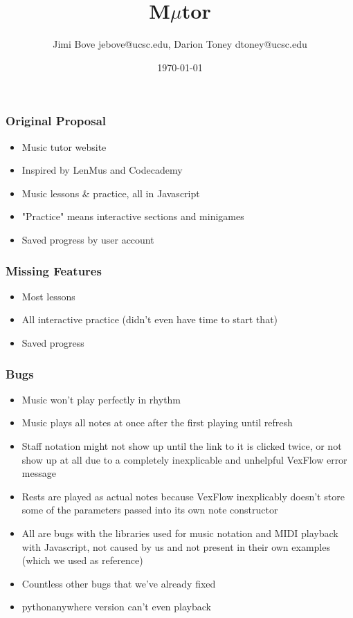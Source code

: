 \documentclass[24pt]{beamer}
\title{M$\mu$tor}
\author{Jimi Bove jebove@ucsc.edu, Darion Toney dtoney@ucsc.edu}
\date{\today}
\begin{document}
\maketitle

\begin{frame}
\frametitle{Original Proposal}
\begin{itemize}
  \item Music tutor website
  \item Inspired by LenMus and Codecademy
  \item Music lessons \& practice, all in Javascript
  \item "Practice" means interactive sections and minigames
  \item Saved progress by user account
\end{itemize}
\end{frame}

\begin{frame}
\frametitle{Missing Features}
\begin{itemize}
  \item Most lessons
  \item All interactive practice (didn't even have time to start that)
  \item Saved progress
\end{itemize}
\end{frame}

\begin{frame}
\frametitle{Bugs}
\begin{itemize}
  \item Music won't play perfectly in rhythm
  \item Music plays all notes at once after the first playing until refresh
  \item Staff notation might not show up until the link to it is clicked twice, or not show up at all due to a completely inexplicable and unhelpful VexFlow error message
  \item Rests are played as actual notes because VexFlow inexplicably doesn't store some of the parameters passed into its own note constructor
  \item All are bugs with the libraries used for music notation and MIDI playback with Javascript, not caused by us and not present in their own examples (which we used as reference)
  \item Countless other bugs that we've already fixed
  \item pythonanywhere version can't even playback
\end{itemize}
\end{frame}
\end{document}
